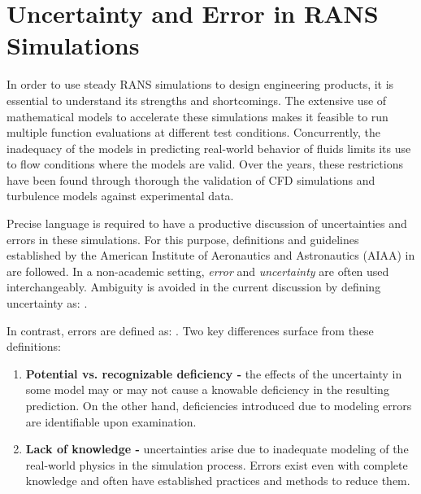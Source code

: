 \section{Uncertainty and Error in RANS Simulations}

In order to use steady RANS simulations to design engineering products, it is essential to understand its strengths and shortcomings.
The extensive use of mathematical models to accelerate these simulations makes it feasible to run multiple function evaluations at different test conditions.
Concurrently, the inadequacy of the models in predicting real-world behavior of fluids limits its use to flow conditions where the models are valid.
Over the years, these restrictions have been found through thorough the validation of CFD simulations and turbulence models \cite{oberkampf_verication_2002} against experimental data. 

Precise language is required to have a productive discussion of uncertainties and errors in these simulations.
For this purpose, definitions and guidelines established by the American Institute of Aeronautics and Astronautics (AIAA) in \cite{computational_fluid_dynamics_committee_guide_1998} are followed.
In a non-academic setting, \textit{error} and \textit{uncertainty} are often used interchangeably.
Ambiguity is avoided in the current discussion by defining uncertainty as: 
 \cite{computational_fluid_dynamics_committee_guide_1998}. 

In contrast, errors are defined as: 
 \cite{computational_fluid_dynamics_committee_guide_1998}.
Two key differences surface from these definitions: 

\begin{enumerate}
    \item \textbf{Potential vs. recognizable deficiency -} the effects of the uncertainty in some model may or may not cause a knowable deficiency in the resulting prediction. On the other hand, deficiencies introduced due to modeling errors are identifiable upon examination. 
    
    \item \textbf{Lack of knowledge -} uncertainties arise due to inadequate modeling of the real-world physics in the simulation process.  Errors exist even with complete knowledge and often have established practices and methods to reduce them.  
\end{enumerate}

